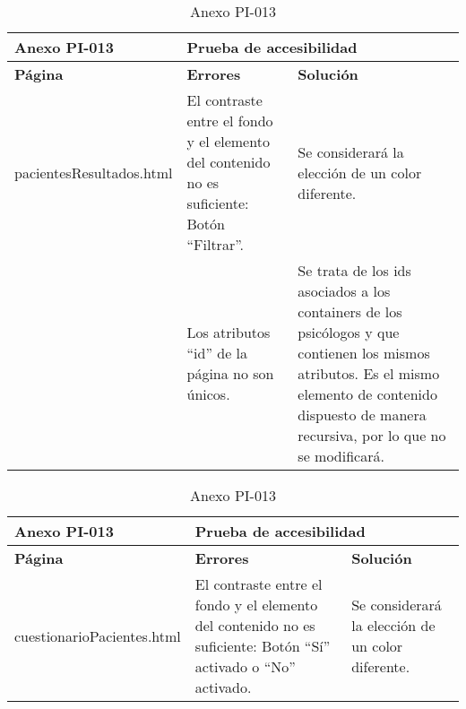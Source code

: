 \begin{table}[htpb]
\centering
\begin{tabularx}{\textwidth}{|l|X|X|}
\hline
\textbf{Anexo PI-013}    & \multicolumn{2}{l|}{\textbf{Prueba de accesibilidad}}                                                                                                                                                                                                                                             \\ \hline
\textbf{Página}          & \textbf{Errores}                                                                           & \textbf{Solución}                                                                                                                                                                                    \\ \hline
pacientesResultados.html & El contraste entre el fondo y el elemento del contenido no es suficiente: Botón “Filtrar”. & Se considerará la elección de un color diferente.                                                                                                                                                    \\ 
                         & Los atributos “id” de la página no son únicos.                                             & Se trata de los ids asociados a los containers de los psicólogos y que contienen los mismos atributos. Es el mismo elemento de contenido dispuesto de manera recursiva, por lo que no se modificará. \\ \hline
\end{tabularx}
\caption{Anexo PI-013}
\end{table}


\begin{table}[htpb]
\centering
\begin{tabularx}{\textwidth}{|l|X|X|}
\hline
\textbf{Anexo PI-013}      & \multicolumn{2}{l|}{\textbf{Prueba de accesibilidad}}                                                                                                                                                               \\ \hline
\textbf{Página}            & \textbf{Errores}                                                                                                                                                & \textbf{Solución}                                 \\ \hline
cuestionarioPacientes.html & El contraste entre el fondo y el elemento del contenido no es suficiente: Botón “Sí” activado o “No” activado. & Se considerará la elección de un color diferente.                                                                                                                                                    \\ \hline
\end{tabularx}
\caption{Anexo PI-013}
\end{table}


